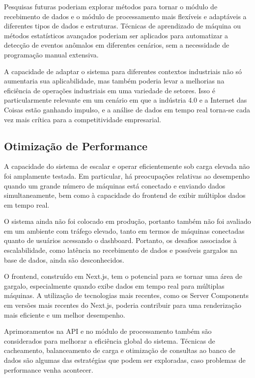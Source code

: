 Pesquisas futuras poderiam explorar métodos para tornar o módulo de recebimento de dados e o módulo de processamento mais flexíveis e adaptáveis a diferentes tipos de dados e estruturas. Técnicas de aprendizado de máquina ou métodos estatísticos avançados poderiam ser aplicados para automatizar a detecção de eventos anômalos em diferentes cenários, sem a necessidade de programação manual extensiva.

A capacidade de adaptar o sistema para diferentes contextos industriais não só aumentaria sua aplicabilidade, mas também poderia levar a melhorias na eficiência de operações industriais em uma variedade de setores. Isso é particularmente relevante em um cenário em que a indústria 4.0 e a Internet das Coisas estão ganhando impulso, e a análise de dados em tempo real torna-se cada vez mais crítica para a competitividade empresarial.

\subsection{Otimização de Performance}

A capacidade do sistema de escalar e operar eficientemente sob carga elevada não foi amplamente testada. Em particular, há preocupações relativas ao desempenho quando um grande número de máquinas está conectado e enviando dados simultaneamente, bem como à capacidade do frontend de exibir múltiplos dados em tempo real.

O sistema ainda não foi colocado em produção, portanto também não foi avaliado em um ambiente com tráfego elevado, tanto em termos de máquinas conectadas quanto de usuários acessando o dashboard. Portanto, os desafios associados à escalabilidade, como latência no recebimento de dados e possíveis gargalos na base de dados, ainda são desconhecidos.

O frontend, construído em Next.js, tem o potencial para se tornar uma área de gargalo, especialmente quando exibe dados em tempo real para múltiplas máquinas. A utilização de tecnologias mais recentes, como os Server Components em versões mais recentes do Next.js, poderia contribuir para uma renderização mais eficiente e um melhor desempenho.

Aprimoramentos na API e no módulo de processamento também são considerados para melhorar a eficiência global do sistema. Técnicas de cacheamento, balanceamento de carga e otimização de consultas ao banco de dados são algumas das estratégias que podem ser exploradas, caso problemas de performance venha acontecer.

